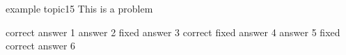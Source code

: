 \documentclass{exam}
\begin{document}

\begin{problem}{example topic}{15}
  This is a problem
  \begin{answers}
    \answer correct answer 1
    \answer answer 2
    \answer fixed answer 3
    \answer correct fixed answer 4
    \answer answer 5
    \answer fixed correct answer 6
  \end{answers}
\end{problem}
\end{document}
